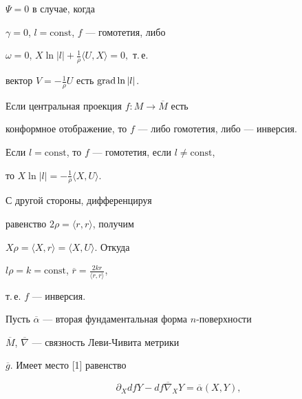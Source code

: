 \begin{pf} $\Psi =0$ в случае, когда


$\gamma = 0$, $l=\text{const}$, $f$ --- гомотетия, либо


$\omega = 0$, $X \ln|l|+ \frac{1}{\rho}\langle U,X\rangle =0,$ т.\,е.


вектор $V = - \frac{1}{\rho} U$  есть  $\operatorname{grad} \ln|l|$.


\end{pf}





\begin{cor}


Если  центральная проекция $f: M \rightarrow \overline{M}$  есть


конформное отображение, то $f$ --- либо гомотетия, либо --- инверсия.


\end{cor}





\begin{pf}


Если $l=\text{const}$, то $f$ --- гомотетия, если $l\ne\text{const}$,


то $X \ln|l| = -\frac{1}{\rho}\langle X,U\rangle$. 


С другой стороны, дифференцируя


равенство $2\rho =\langle r,r\rangle$, получим


$X\rho =\langle X,r\rangle=\langle X,U\rangle$. Откуда


$l\rho= k=\text{const}$, $\overline{r}= \frac{2kr}{\langle r,r\rangle}$,


т.\,е. $f$ --- инверсия. 


\end{pf}





Пусть $\overline{\alpha}$ --- вторая фундаментальная форма $n$-поверхности


$\overline{M}$, $\overline{\nabla}$ --- связность  Леви-Чивита метрики


$\overline{g}$. Имеет место  [1] равенство


\begin{equation}


\partial _{X}df Y-df\overline{\nabla}_{X}Y=  \overline{\alpha}(X,Y),


\end{equation} 


